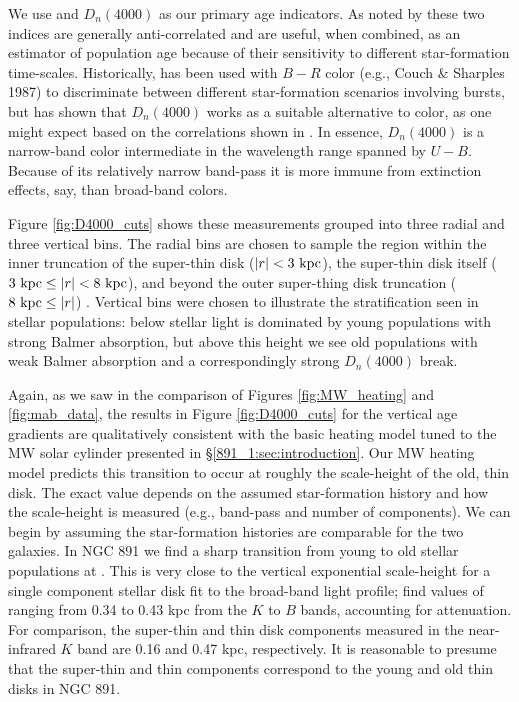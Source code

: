We use \Hda and $D_n(4000)$ as our primary age indicators. As noted by
\citet{Hamilton85} these two indices are generally anti-correlated and
are useful, when combined, as an estimator of population age because
of their sensitivity to different star-formation time-scales.
Historically, \Hda has been used with $B-R$ color (e.g., Couch \&
Sharples 1987) to discriminate between different star-formation
scenarios involving bursts, but \citet{Balogh99} has shown that
$D_n(4000)$ works as a suitable alternative to color, as one might
expect based on the correlations shown in \citet{Hamilton85}. In
essence, $D_n(4000)$ is a narrow-band color intermediate in the
wavelength range spanned by $U-B$. Because of its relatively narrow
band-pass it is more immune from extinction effects, say, than
broad-band colors.

Figure \ref{fig:D4000_cuts} shows these measurements grouped into
three radial and three vertical bins. The radial bins are chosen to
sample the region within the inner truncation of the super-thin disk
($|r| < 3~\mathrm{kpc} $), the super-thin disk itself ($3~\mathrm{kpc} \leq
|r| < 8~\mathrm{kpc} $), and beyond the outer super-thing disk truncation
($8~\mathrm{kpc}  \leq |r|$) \citep{Schechtman-Rook13}. Vertical bins
were chosen to illustrate the stratification seen in stellar
populations: below  stellar light is dominated by young
populations with strong Balmer absorption, but above this height we
see old populations with weak Balmer absorption and a correspondingly
strong $D_n(4000)$ break.

Again, as we saw in the comparison of Figures \ref{fig:MW_heating} and
\ref{fig:mab_data}, the results in Figure \ref{fig:D4000_cuts} for
the vertical age gradients are qualitatively consistent with the basic
heating model tuned to the MW solar cylinder presented in
\S\ref{891_1:sec:introduction}. Our MW heating model predicts this
transition to occur at roughly the scale-height of the old, thin
disk. The exact value depends on the assumed star-formation history
and how the scale-height is measured (e.g., band-pass and number of
components). We can begin by assuming the star-formation histories are
comparable for the two galaxies. In NGC 891 we find a sharp transition
from young to old stellar populations at . This is very
close to the vertical exponential scale-height for a single component
stellar disk fit to the broad-band light profile; \citet{Xilouris99}
find values of ranging from 0.34 to 0.43 kpc from the $K$ to $B$
bands, accounting for attenuation. For comparison, the super-thin and
thin disk components measured in the near-infrared $K$ band are 0.16
and 0.47 kpc, respectively. It is reasonable to presume that the
super-thin and thin components correspond to the young and old thin
disks in NGC 891.

